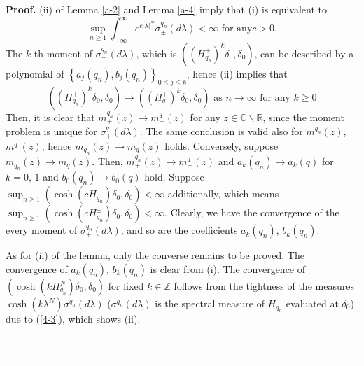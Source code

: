 \documentclass[a4paper]{article}%
\newenvironment{proof}[1][Proof]{\noindent\textbf{#1.} }{\ \rule{0.5em}{0.5em}}
\begin{document}
\begin{proof}
(ii) of Lemma \ref{a-2} and Lemma \ref{a-4} imply that (i) is equivalent to%
\[
\sup_{n\geq1}\int_{-\infty}^{\infty}e^{c\left\vert \lambda\right\vert ^{N}%
}\sigma_{\pm}^{q_{n}}\left(  d\lambda\right)  <\infty\text{ \ for any
}c>0\text{.}%
\]
The $k$-th moment of $\sigma_{+}^{q_{n}}\left(  d\lambda\right)  $, which is
$\left(  \left(  H_{q_{n}}^{+}\right)  ^{k}\delta_{0},\delta_{0}\right)  $,
can be described by a polynomial of $\left\{  a_{j}\left(  q_{n}\right)
,b_{j}\left(  q_{n}\right)  \right\}  _{0\leq j\leq k}$, hence (ii) implies
that%
\[
\left(  \left(  H_{q_{n}}^{+}\right)  ^{k}\delta_{0},\delta_{0}\right)
\rightarrow\left(  \left(  H_{q}^{+}\right)  ^{k}\delta_{0},\delta_{0}\right)
\text{ as }n\rightarrow\infty\text{ for any }k\geq0
\]
Then, it is clear that $m_{+}^{q_{n}}\left(  z\right)  \rightarrow m_{+}%
^{q}\left(  z\right)  $ for any $z\in\mathbb{C}\backslash\mathbb{R}$, since
the moment problem is unique for $\sigma_{+}^{q}\left(  d\lambda\right)  $.
The same conclusion is valid also for $m_{-}^{q_{n}}\left(  z\right)  $,
$m_{-}^{q}\left(  z\right)  $, hence $m_{q_{n}}\left(  z\right)  \rightarrow
m_{q}\left(  z\right)  $ holds. Conversely, suppose $m_{q_{n}}\left(
z\right)  \rightarrow m_{q}\left(  z\right)  $. Then, $m_{+}^{q_{n}}\left(
z\right)  \rightarrow m_{+}^{q}\left(  z\right)  $ and $a_{k}\left(
q_{n}\right)  \rightarrow a_{k}\left(  q\right)  $ for $k=0$, $1$ and
$b_{0}\left(  q_{n}\right)  \rightarrow b_{0}\left(  q\right)  $ hold. Suppose
$\sup_{n\geq1}\left(  \cosh\left(  cH_{q_{n}}\right)  \delta_{0},\delta
_{0}\right)  <\infty$ additionally, which means $\sup_{n\geq1}\left(
\cosh\left(  cH_{q_{n}}^{\pm}\right)  \delta_{0},\delta_{0}\right)  <\infty$.
Clearly, we have the convergence of the every moment of $\sigma_{\pm}^{q_{n}%
}\left(  d\lambda\right)  $, and so are the coefficients $a_{k}\left(
q_{n}\right)  $, $b_{k}\left(  q_{n}\right)  $.

As for (ii) of the lemma, only the converse remains to be proved. The
convergence of $a_{k}\left(  q_{n}\right)  $, $b_{k}\left(  q_{n}\right)  $ is
clear from (i). The convergence of $\left(  \cosh\left(  kH_{q_{n}}%
^{N}\right)  \delta_{0},\delta_{0}\right)  $ for fixed $k\in\mathbb{Z}$
follows from the tightness of the measures $\cosh\left(  k\lambda^{N}\right)
\sigma^{q_{n}}\left(  d\lambda\right)  $ ($\sigma^{q_{n}}\left(
d\lambda\right)  $ is the spectral measure of $H_{q_{n}}$ evaluated at
$\delta_{0}$) due to (\ref{4-3}), which shows (ii).


\end{proof}
\end{document}
